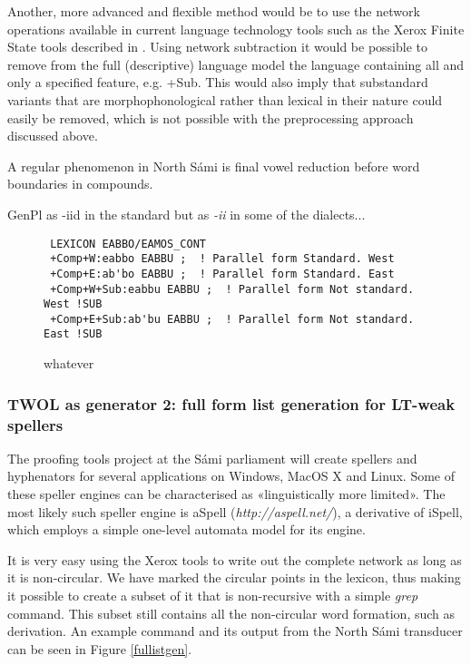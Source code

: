 \documentclass[a4paper,english]{article}
\begin{document}

Another, more advanced and flexible method would be to use the network operations available in current language technology tools such as the Xerox Finite State tools described in \cite{Beesley03}. Using network subtraction it would be possible to remove from the full (descriptive) language model the language containing all and only a specified feature, e.g. +Sub. This would also imply that substandard variants that are morphophonological rather than lexical in their nature could easily be removed, which is not possible with the preprocessing approach discussed above.

A regular phenomenon in North Sámi is final vowel reduction before word boundaries in compounds.


GenPl as -iid in the standard but as \textit{-ii}
 in some of the dialects...

\begin{figure}[htbp]
\caption{whatever}
\begin{center}
\begin{verbatim}
 LEXICON EABBO/EAMOS_CONT
 +Comp+W:eabbo EABBU ;  ! Parallel form Standard. West
 +Comp+E:ab'bo EABBU ;  ! Parallel form Standard. East
 +Comp+W+Sub:eabbu EABBU ;  ! Parallel form Not standard. West !SUB
 +Comp+E+Sub:ab'bu EABBU ;  ! Parallel form Not standard. East !SUB
\end{verbatim}
\label{EWadjcomp}
\end{center}
\end{figure}

\subsubsection{TWOL as generator 2: full form list generation for LT-weak spellers}\label{aspell}

The proofing tools project at the Sámi parliament will create spellers and hyphenators for several applications on Windows, MacOS X and Linux. Some of these speller engines can be characterised as «linguistically more limited». The most likely such speller engine is aSpell (\textit{http://aspell.net/}), a derivative of iSpell, which employs a simple one-level automata model for its engine.

It is very easy using the Xerox tools to write out the complete network as long as it is non-circular. We have marked the circular points in the lexicon, thus making it possible to create a subset of it that is non-recursive with a simple \textit{grep} command. This subset still contains all the non-circular word formation, such as derivation. An example command and its output from the North Sámi transducer can be seen in Figure \ref{fullistgen}.
\end{document}
